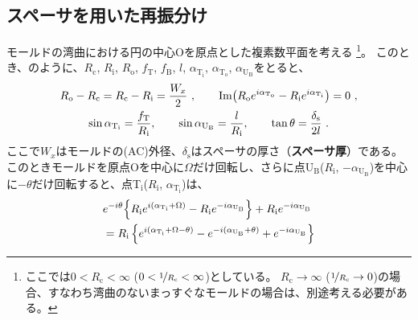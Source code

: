 \subsection{スペーサを用いた再振分け}
モールドの湾曲における円の中心Oを原点とした複素数平面を考える
\footnote{ここでは$0 < R_\mathrm c < \infty$ ($0 < \nicefrac1{R_\mathrm c} < \infty$)としている。
$R_\mathrm c \to \infty$ ($\nicefrac1{R_\mathrm c} \to 0$)の場合、すなわち湾曲のないまっすぐなモールドの場合は、別途考える必要がある。}。
このとき、のように、$R_\mathrm c$, $R_\mathrm i$, $R_\mathrm o$, $f_\mathrm T$, $f_\mathrm B$, $l$, $\alpha_{\mathrm T_\mathrm i}$, $\alpha_{\mathrm T_\mathrm o}$, $\alpha_{\mathrm U_\mathrm B}$をとると、
\begin{subequations}
\begin{gather}
  \label{eq:constraintUpoint1}
  R_\mathrm o - R_\mathrm c = R_\mathrm c - R_\mathrm i = \frac{W_x}2~, \qquad
  \operatorname{Im}\!\left(R_\mathrm oe^{i\alpha_{\mathrm T_\mathrm o}} - R_\mathrm ie^{i\alpha_{\mathrm T_\mathrm i}}\right)
  = 0~,\\
  \label{eq:constraintUpoint2}
  \sin\alpha_{\mathrm T_\mathrm i} = \frac{f_\mathrm T}{R_\mathrm i}, \qquad
  \sin\alpha_{\mathrm U_\mathrm B} = \frac l{R_\mathrm i}, \qquad
  \tan\theta = \frac{\delta_\mathrm s}{2l}~.
\end{gather}
\end{subequations}
ここで$W_x$はモールドの(AC)外径、$\delta_\mathrm s$はスペーサの厚さ（\textbf{スペーサ厚}）である。
このときモールドを原点Oを中心に$\Omega$だけ回転し、さらに点U$_\mathrm B$($R_\mathrm i$, $-\alpha_{\mathrm U_\mathrm B}$)を中心に$-\theta$だけ回転すると、点T$_\mathrm i$($R_\mathrm i$, $\alpha_{\mathrm T_\mathrm i}$)は、
\begin{align}
  \notag
  & e^{-i\theta}\!\left\{R_\mathrm ie^{i(\alpha_{\mathrm T_\mathrm i} + \Omega)} - R_\mathrm ie^{-i\alpha_{\mathrm U_\mathrm B}}\right\}
    +R_\mathrm ie^{-i\alpha_{\mathrm U_\mathrm B}}\\
  &= R_\mathrm i
     \left\{
       e^{i(\alpha_{\mathrm T_\mathrm i} + \Omega - \theta)} - e^{-i(\alpha_{\mathrm U_\mathrm B} + \theta)} + e^{-i\alpha_{\mathrm U_\mathrm B}}
     \right\}
  \label{eq:afterftUpoint}
\end{align}
